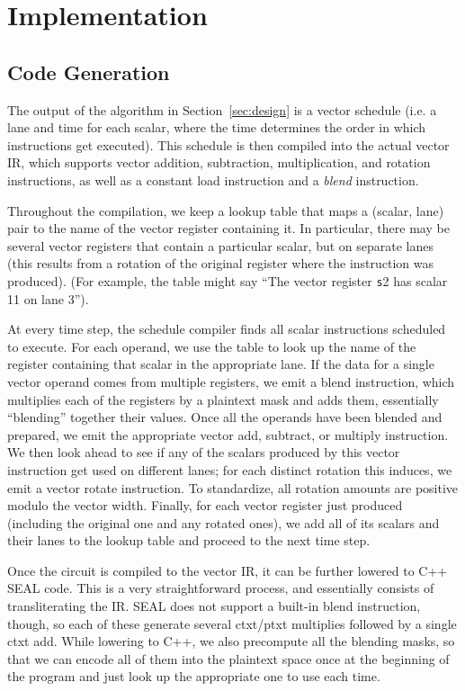 \section{Implementation}\label{sec:implementation}
\subsection{Code Generation}
The output of the algorithm in Section~\ref{sec:design} is a vector schedule (i.e. a lane and time for each scalar, where the time determines the order in which instructions get executed). 
This schedule is then compiled into the actual vector IR, which supports vector addition, subtraction, multiplication, and rotation instructions, as well as a constant load instruction and a {\em blend} instruction.

Throughout the compilation, we keep a lookup table that maps a (scalar, lane) pair to the name of the vector register containing it.
In particular, there may be several vector registers that contain a particular scalar, but on separate lanes (this results from a rotation of the original register where the instruction was produced).
(For example, the table might say ``The vector register {\texttt s2} has scalar 11 on lane 3'').

At every time step, the schedule compiler finds all scalar instructions scheduled to execute.
For each operand, we use the table to look up the name of the register containing that scalar in the appropriate lane.
If the data for a single vector operand comes from multiple registers, we emit a blend instruction, which multiplies each of the registers by a plaintext mask and adds them, essentially ``blending'' together their values.
Once all the operands have been blended and prepared, we emit the appropriate vector add, subtract, or multiply instruction.
We then look ahead to see if any of the scalars produced by this vector instruction get used on different lanes; for each distinct rotation this induces, we emit a vector rotate instruction.
To standardize, all rotation amounts are positive modulo the vector width.
Finally, for each vector register just produced (including the original one and any rotated ones), we add all of its scalars and their lanes to the lookup table and proceed to the next time step.

Once the circuit is compiled to the vector IR, it can be further lowered to C++ SEAL code.
This is a very straightforward process, and essentially consists of transliterating the IR. 
SEAL does not support a built-in blend instruction, though, so each of these generate several ctxt/ptxt multiplies followed by a single ctxt add.
While lowering to C++, we also precompute all the blending masks, so that we can encode all of them into the plaintext space once at the beginning of the program and just look up the appropriate one to use each time.


